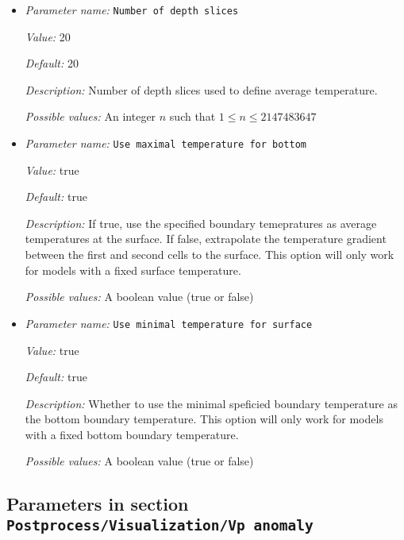 \begin{itemize}
\item {\it Parameter name:} {\tt Number of depth slices}
\label{parameters:Postprocess/Visualization/Temperature anomaly/Number of depth slices}


{\it Value:} 20


{\it Default:} 20


{\it Description:} Number of depth slices used to define average temperature.


{\it Possible values:} An integer $n$ such that $1\leq n \leq 2147483647$
\item {\it Parameter name:} {\tt Use maximal temperature for bottom}
\label{parameters:Postprocess/Visualization/Temperature anomaly/Use maximal temperature for bottom}


{\it Value:} true


{\it Default:} true


{\it Description:} If true, use the specified boundary temepratures as average temperatures at the surface. If false, extrapolate the temperature gradient between the first and second cells to the surface. This option will only work for models with a fixed surface temperature. 


{\it Possible values:} A boolean value (true or false)
\item {\it Parameter name:} {\tt Use minimal temperature for surface}
\label{parameters:Postprocess/Visualization/Temperature anomaly/Use minimal temperature for surface}


{\it Value:} true


{\it Default:} true


{\it Description:} Whether to use the minimal speficied boundary temperature as the bottom boundary temperature. This option will only work for models with a fixed bottom boundary temperature. 


{\it Possible values:} A boolean value (true or false)
\end{itemize}

\subsection{Parameters in section \tt Postprocess/Visualization/Vp anomaly}
\label{parameters:Postprocess/Visualization/Vp_20anomaly}

